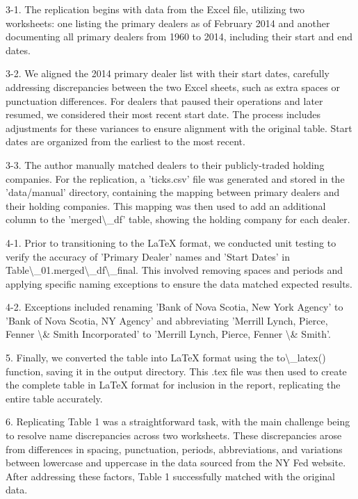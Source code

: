 \documentclass{article}
\begin{document}
3-1. The replication begins with data from the Excel file, utilizing two worksheets: one listing 
the primary dealers as of February 2014 and another documenting all primary dealers from 1960 to 2014, 
including their start and end dates. 

3-2. We aligned the 2014 primary dealer list with their start dates, carefully addressing discrepancies 
between the two Excel sheets, such as extra spaces or punctuation differences.  For dealers that paused 
their operations and later resumed, we considered their most recent start date. The process includes 
adjustments for these variances to ensure alignment with the original table. Start dates are organized 
from the earliest to the most recent. 

3-3. The author manually matched dealers to their publicly-traded holding companies. For the replication, 
a 'ticks.csv' file was generated and stored in the 'data/manual' directory, containing the mapping between 
primary dealers and their holding companies. This mapping was then used to add an additional column to the 
'merged\textbackslash{}_df' table, showing the holding company for each dealer.

4-1. Prior to transitioning to the LaTeX format, we conducted unit testing to verify the accuracy of 'Primary 
Dealer' names and 'Start Dates' in Table\textbackslash{}_01.merged\textbackslash{}_df\textbackslash{}_final. This involved removing spaces and periods and 
applying specific naming exceptions to ensure the data matched expected results.

4-2. Exceptions included renaming 'Bank of Nova Scotia, New York Agency' to 'Bank of Nova Scotia, NY Agency' 
and abbreviating 'Merrill Lynch, Pierce, Fenner \textbackslash{}& Smith Incorporated' to 'Merrill Lynch, Pierce, Fenner \textbackslash{}& Smith'.

5. Finally, we converted the table into LaTeX format using the to\textbackslash{}_latex() function, saving it in the output directory.
This .tex file was then used to create the complete table in LaTeX format for inclusion in the report, replicating the
entire table accurately.

6. Replicating Table 1 was a straightforward task, with the main challenge being to resolve name discrepancies across 
two worksheets. These discrepancies arose from differences in spacing, punctuation, periods, abbreviations, and 
variations between lowercase and uppercase in the data sourced from the NY Fed website. After addressing these factors, 
Table 1 successfully matched with the original data.
\end{document}
